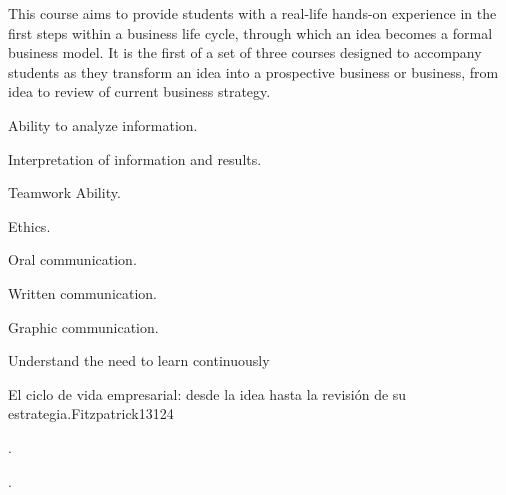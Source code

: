 \begin{syllabus}


\begin{justification}
This course aims to provide students with a real-life hands-on experience in the first steps within a business life cycle, through which an idea becomes a formal business model.
It is the first of a set of three courses designed to accompany students as they transform an idea into a prospective business or business, from idea to review of current business strategy.
\end{justification}

\begin{goals}
   \item Ability to analyze information.
   \item Interpretation of information and results.
   \item Teamwork Ability.
   \item Ethics.
   \item Oral communication.
   \item Written communication.
   \item Graphic communication.
   \item Understand the need to learn continuously
\end{goals}

\begin{outcomes}
    \item {}
    \item {}
\end{outcomes}

\begin{competences}
    \item {}
\end{competences}


\begin{unit}{}{El ciclo de vida empresarial: desde la idea hasta la revisión de su estrategia.}{Fitzpatrick13}{12}{4}
   \begin{topics}
      \item .
   \end{topics}
   \begin{learningoutcomes}
      \item .
   \end{learningoutcomes}
\end{unit}


\end{syllabus}
